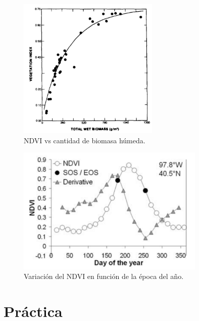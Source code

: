 \documentclass[]{beamer}
\begin{document}
\begin{frame}{\subsecname}
    \begin{figure}
    \centering
    \includegraphics[width=0.6\textwidth]{imagenes/avndvi.png}
    \caption{NDVI vs cantidad de biomasa húmeda.}
    \end{figure}
\end{frame}



\begin{frame}{\subsecname}
    \begin{figure}
    \centering
    \includegraphics[width=0.8\textwidth]{imagenes/ndvivst.png}
    \caption{Variación del NDVI en función de la época del año.}
    \end{figure}
\end{frame}


\section{Práctica}
\end{document}
